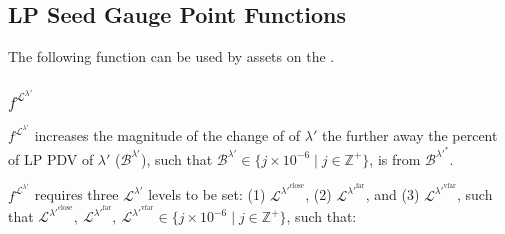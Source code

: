 \documentclass[class=article, crop=false]{standalone}
\begin{document}

\subsection{LP Seed Gauge Point Functions}

The following  function can be used by assets on the .


\subsubsection{$f^{\mathscr{L}^{\lambda'}}$}

$f^{\mathscr{L}^{\lambda'}}$ increases the magnitude of the change of  of $\lambda'$ the further away the percent of  LP PDV of $\lambda'$ ($\mathscr{B}^{\lambda'}$), such that $\mathscr{B}^{\lambda'} \in \{j \times 10^{-6} \mid j \in \mathbb{Z}^{+} \}$, is from $\mathscr{B}^{{\lambda'}^{*}}$.

$f^{\mathscr{L}^{\lambda'}}$ requires three $\mathscr{L}^{\lambda'}$ levels to be set: (1) $\mathscr{L}^{\lambda'^{\text{close}}}$, (2) $\mathscr{L}^{\lambda'^{\text{far}}}$, and (3) $\mathscr{L}^{\lambda'^{\text{vfar}}}$, such that $\mathscr{L}^{\lambda'^{\text{close}}},\ \mathscr{L}^{\lambda'^{\text{far}}},\ \mathscr{L}^{\lambda'^{\text{vfar}}} \in \{j \times 10^{-6} \mid j \in \mathbb{Z}^{+} \}$, such that:
\end{document}
